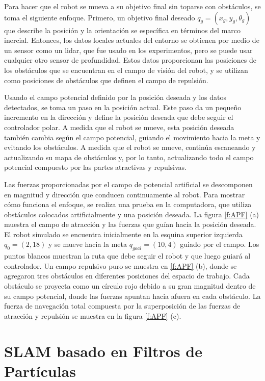 Para hacer que el robot se mueva a su objetivo final sin toparse con obstáculos, se 
toma el siguiente enfoque. Primero, un objetivo final deseado $q_{g} =(x_{g}, y_{g}, 
\theta_{g})$ que describe la posición y la orientación se específica en términos del 
marco inercial. Entonces, los datos locales actuales del entorno se obtienen por medio 
de un sensor como un lidar, que fue usado en los experimentos, pero se puede usar cualquier 
otro sensor de profundidad. Estos datos proporcionan las posiciones de los obstáculos que 
se encuentran en el campo de visión del robot, y se utilizan como posiciones de obstáculos 
que definen el campo de repulsión.

Usando el campo potencial definido por la posición deseada y los datos detectados, se toma un paso 
en la posición actual. Este paso da un pequeño incremento en la dirección y define la 
posición deseada que debe seguir el controlador polar. A medida que el robot se mueve, esta 
posición deseada también cambia según el campo potencial, guiando el movimiento hacia la meta 
y evitando los obstáculos. A medida que el robot se mueve, continúa escaneando y actualizando 
su mapa de obstáculos y, por lo tanto, actualizando todo el campo potencial compuesto por las 
partes atractivas y repulsivas.

Las fuerzas proporcionadas por el campo de potencial artificial se descomponen en 
magnitud y dirección que conducen continuamente al robot. Para mostrar cómo funciona el 
enfoque, se realiza una prueba en la computadora, que utiliza obstáculos 
colocados artificialmente y una posición deseada. La figura \ref{f:APF} (a) muestra el campo 
de atracción y las fuerzas que guían hacia la posición deseada. El robot simulado se 
encuentra inicialmente en la esquina superior izquierda $q_{0} = (2,18)$ y se mueve hacia 
la meta $q_{goal} = (10,4)$ guiado por el campo. Los puntos blancos muestran la ruta que debe 
seguir el robot y que luego guiará al controlador. Un campo repulsivo puro se muestra en 
\ref{f:APF} (b), donde se agregaron tres obstáculos en diferentes posiciones del espacio de 
trabajo. Cada obstáculo se proyecta como un círculo rojo debido a su gran magnitud dentro de 
su campo potencial, donde las fuerzas apuntan hacia afuera en cada obstáculo. La fuerza de 
navegación total compuesta por la superposición de las fuerzas de atracción y repulsión se 
muestra en la figura \ref{f:APF} (c).

\section{SLAM basado en Filtros de Part\'iculas}

